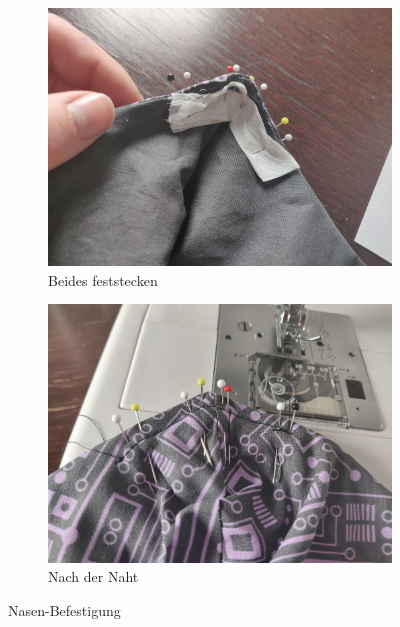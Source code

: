 \documentclass[12pt,parskip=full]{scrartcl}
\begin{document}
\begin{figure}[hp]
\begin{subfigure}{0.48\textwidth}
        \includegraphics[width = \linewidth]{Pictures/09_NoseParts/NoseParts07_resized.jpg}
        \caption{Beides feststecken}
        \label{Nose07}
    \end{subfigure}
    \begin{subfigure}{0.48\textwidth}
        \centering
        \includegraphics[width = \linewidth]{Pictures/09_NoseParts/NoseParts08_resized.jpg}
        \caption{Nach der Naht}
        \label{Nose08}
    \end{subfigure}
    \caption{Nasen-Befestigung}
    \label{NoseMain}
\end{figure}
\end{document}
